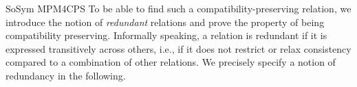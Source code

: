 \begin{copiedFrom}{SoSym MPM4CPS}
To be able to find such a compatibility-preserving relation, we introduce the notion of \emph{redundant} relations and prove the property of being compatibility preserving.
Informally speaking, a relation is redundant if it is expressed transitively across others, i.e., if it does not restrict or relax consistency compared to a combination of other relations.
We precisely specify a notion of redundancy in the following.



\end{copiedFrom}
